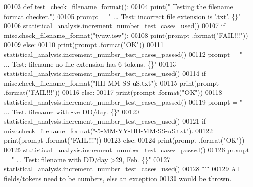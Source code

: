 \begin{DoxyCode}
\hypertarget{classutilities_1_1miscellaneous__tester_1_1misc__tester_l00103}{}\hyperlink{classutilities_1_1miscellaneous__tester_1_1misc__tester_a885a28d6852ecd76a814e6338ddfa0b3}{00103}     \textcolor{keyword}{def }\hyperlink{classutilities_1_1miscellaneous__tester_1_1misc__tester_a885a28d6852ecd76a814e6338ddfa0b3}{test\_check\_filename\_format}():
00104         print(\textcolor{stringliteral}{" Testing the filename format checker."})
00105         prompt = \textcolor{stringliteral}{"  ... Test: incorrect file extension is '.txt'.       \{\}"}
00106         statistical\_analysis.increment\_number\_test\_cases\_used()
00107         \textcolor{keywordflow}{if} misc.check\_filename\_format(\textcolor{stringliteral}{"tyuw.iew"}):
00108             print(prompt .format(\textcolor{stringliteral}{"FAIL!!!"}))
00109         \textcolor{keywordflow}{else}:
00110             print(prompt .format(\textcolor{stringliteral}{"OK"}))
00111             statistical\_analysis.increment\_number\_test\_cases\_passed()
00112         prompt = \textcolor{stringliteral}{"  ... Test: filename no file extension has 6 tokens.  \{\}"}
00113         statistical\_analysis.increment\_number\_test\_cases\_used()
00114         \textcolor{keywordflow}{if} misc.check\_filename\_format(\textcolor{stringliteral}{"HH-MM-SS-uS.txt"}):
00115             print(prompt .format(\textcolor{stringliteral}{"FAIL!!!"}))
00116         \textcolor{keywordflow}{else}:
00117             print(prompt .format(\textcolor{stringliteral}{"OK"}))
00118             statistical\_analysis.increment\_number\_test\_cases\_passed()
00119         prompt = \textcolor{stringliteral}{"  ... Test: filename with -ve DD/day.         \{\}"}
00120         statistical\_analysis.increment\_number\_test\_cases\_used()
00121         \textcolor{keywordflow}{if} misc.check\_filename\_format(\textcolor{stringliteral}{"-5-MM-YY-HH-MM-SS-uS.txt"}):
00122             print(prompt .format(\textcolor{stringliteral}{"FAIL!!!"}))
00123         \textcolor{keywordflow}{else}:
00124             print(prompt .format(\textcolor{stringliteral}{"OK"}))
00125             statistical\_analysis.increment\_number\_test\_cases\_passed()
00126         prompt = \textcolor{stringliteral}{"  ... Test: filename with DD/day >29, Feb.        \{\}"}
00127         statistical\_analysis.increment\_number\_test\_cases\_used()
00128         \textcolor{stringliteral}{"""}
00129 \textcolor{stringliteral}{            All fields/tokens need to be numbers, else an exception}
00130 \textcolor{stringliteral}{                would be thrown.}

\end{DoxyCode}
